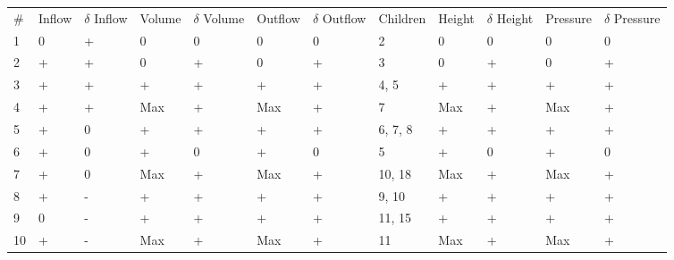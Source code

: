 \documentclass{article}
\begin{document}
\begin{table}
	\small
	\begin{adjustbox}{center}
	\begin{tabular}{@{}llllllllllll}
		\# & Inflow & $\delta$ Inflow & Volume & $\delta$ Volume & Outflow & $\delta$ Outflow & Children & Height & $\delta$ Height & Pressure & $\delta$ Pressure  \\
		1  & 0      & +           & 0      & 0           & 0       & 0            & 2        & 0      & 0                                & 0        & 0                                   \\
		2  & +      & +           & 0      & +           & 0       & +            & 3        & 0      & +                                & 0        & +                                   \\
		3  & +      & +           & +      & +           & +       & +            & 4, 5     & +      & +                                & +        & +                                   \\
		4  & +      & +           & Max    & +           & Max     & +            & 7        & Max    & +                                & Max      & +                                   \\
		5  & +      & 0           & +      & +           & +       & +            & 6, 7, 8  & +      & +                                & +        & +                                   \\
		6  & +      & 0           & +      & 0           & +       & 0            & 5        & +      & 0                                & +        & 0                                   \\
		7  & +      & 0           & Max    & +           & Max     & +            & 10, 18   & Max    & +                                & Max      & +                                   \\
		8  & +      & -           & +      & +           & +       & +            & 9, 10    & +      & +                                & +        & +                                   \\
		9  & 0      & -           & +      & +           & +       & +            & 11, 15   & +      & +                                & +        & +                                   \\
		10 & +      & -           & Max    & +           & Max     & +            & 11       & Max    & +                                & Max      & +                                   \\

\end{tabular}
\end{adjustbox}
\end{table}
\end{document}
